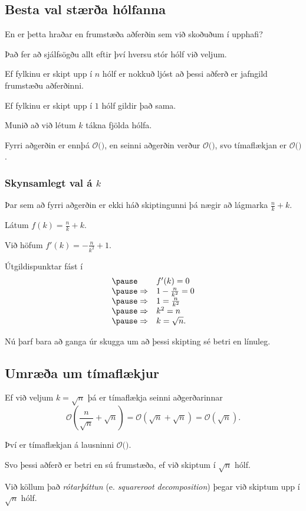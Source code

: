 \subsection{Besta val stærða hólfanna}
{
	{
		\item<1-> En er þetta hraðar en frumstæða aðferðin sem við skoðuðum í upphafi?
		\item<2-> Það fer að sjálfsögðu allt eftir því hversu stór hólf við veljum.
		\item<3-> Ef fylkinu er skipt upp í $n$ hólf er nokkuð ljóst að þessi aðferð er jafngild frumstæðu aðferðinni.
		\item<4-> Ef fylkinu er skipt upp í $1$ hólf gildir það sama.
		\item<5-> Munið að við létum $k$ tákna fjölda hólfa.
		\item<6-> Fyrri aðgerðin er ennþá $\mathcal{O}($\onslide<7->{$\,1\,$}$)$,
			en seinni aðgerðin verður $\mathcal{O}($\onslide<8->{$n/k + k$}$)$,
			svo tímaflækjan er $\mathcal{O}($\onslide<9->{$qn/k + qk$}$)$.
	}
}

{
	\frametitle{Skynsamlegt val á $k$}
	{
		\item Þar sem að fyrri aðgerðin er ekki háð skiptingunni þá nægir að lágmarka $\frac{n}{k} + k$.
		\pause\item Látum $f(k) = \frac{n}{k} + k$.
		\pause\item Við höfum $f'(k) = -\frac{n}{k^2} + 1$.
		\pause\item Útgildispunktar fást í
			\[
				\begin{array}{l l}
				\pause& f'(k) = 0\\
				\pause\Rightarrow & 1 - \frac{n}{k^2} = 0\\
				\pause\Rightarrow & 1 = \frac{n}{k^2}\\
				\pause\Rightarrow & k^2 = n\\
				\pause\Rightarrow & k = \sqrt{n}.
			\end{array}
			\]
		\pause\item Nú þarf bara að ganga úr skugga um að þessi skipting sé betri en línuleg.
}
}

\subsection{Umræða um tímaflækjur}
{
	{
		\item<1-> Ef við veljum $k = \sqrt{n}$ þá er tímaflækja seinni aðgerðarinnar
			\[
				\mathcal{O} \left (\frac{n}{\sqrt{n}} + \sqrt{n}\right ) = \mathcal{O} (\sqrt{n} + \sqrt{n}) = \mathcal{O} (\sqrt{n}).
			\]
		\item<2-> Því er tímaflækjan á lausninni $\mathcal{O}($\onslide<3->{$q\sqrt{n}$}$)$.
		\item<4-> Svo þessi aðferð er betri en sú frumstæða, ef við skiptum í $\sqrt{n}$ hólf.
		\item<5-> Við köllum það \emph{rótarþáttun} (e. \emph{squareroot decomposition}) þegar við skiptum upp í $\sqrt{n}$ hólf.
	}
}

